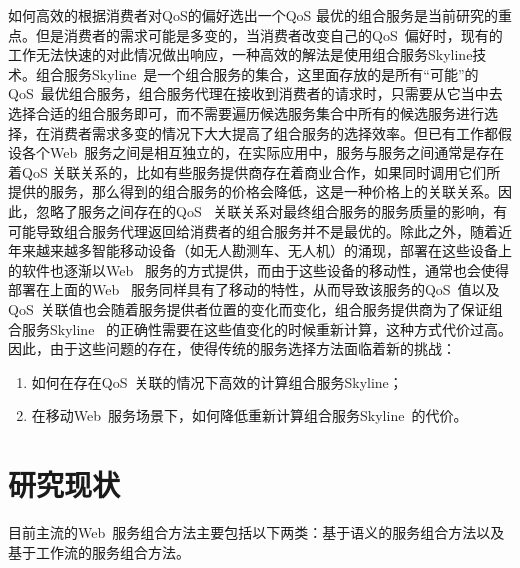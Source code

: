 如何高效的根据消费者对QoS的偏好选出一个QoS 最优的组合服务是当前研究的重点。但是消费者的需求可能是多变的，当消费者改变自己的QoS~偏好时，现有的工作无法快速的对此情况做出响应，一种高效的解法是使用组合服务Skyline技术。组合服务Skyline~是一个组合服务的集合，这里面存放的是所有``可能''的QoS~最优组合服务，组合服务代理在接收到消费者的请求时，只需要从它当中去选择合适的组合服务即可，而不需要遍历候选服务集合中所有的候选服务进行选择，在消费者需求多变的情况下大大提高了组合服务的选择效率。但已有工作都假设各个Web~服务之间是相互独立的，在实际应用中，服务与服务之间通常是存在着QoS 关联关系的，比如有些服务提供商存在着商业合作，如果同时调用它们所提供的服务，那么得到的组合服务的价格会降低，这是一种价格上的关联关系。因此，忽略了服务之间存在的QoS~ 关联关系对最终组合服务的服务质量的影响，有可能导致组合服务代理返回给消费者的组合服务并不是最优的。除此之外，随着近年来越来越多智能移动设备（如无人勘测车、无人机）的涌现，部署在这些设备上的软件也逐渐以Web~ 服务的方式提供，而由于这些设备的移动性，通常也会使得部署在上面的Web~ 服务同样具有了移动的特性，从而导致该服务的QoS~值以及QoS~关联值也会随着服务提供者位置的变化而变化，组合服务提供商为了保证组合服务Skyline~ 的正确性需要在这些值变化的时候重新计算，这种方式代价过高。因此，由于这些问题的存在，使得传统的服务选择方法面临着新的挑战：

\begin{enumerate}

    \item 如何在存在QoS~关联的情况下高效的计算组合服务Skyline；

    \item 在移动Web~服务场景下，如何降低重新计算组合服务Skyline~的代价。

\end{enumerate}

\section{研究现状}\label{S:SEC_StateOfArt}


目前主流的Web~服务组合方法主要包括以下两类：基于语义的服务组合方法以及基于工作流的服务组合方法。

